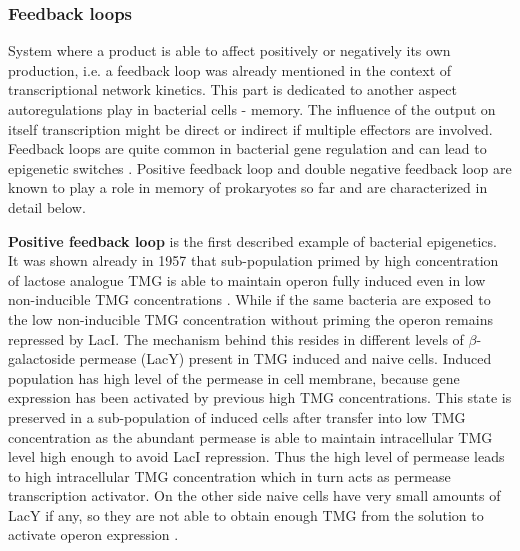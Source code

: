\subsubsection{Feedback loops}
System where a product is able to affect positively or negatively its own production, i.e. a feedback loop was already mentioned in the context of transcriptional network kinetics.
This part is dedicated to another aspect autoregulations play in bacterial cells - memory. 
The influence of the output on itself transcription might be direct or indirect if multiple effectors are involved.
Feedback loops are quite common in bacterial gene regulation and can lead to epigenetic switches \cite{smits2006phenotypic, veening2008bistability}.
Positive feedback loop and double negative feedback loop are known to play a role in memory of prokaryotes so far and are characterized in detail below.

\textbf{Positive feedback loop} is the first described example of bacterial epigenetics.
It was shown already in 1957 that  sub-population primed by high concentration of lactose analogue TMG is able to maintain  operon fully induced even in low non-inducible TMG concentrations \cite{novick1957enzyme}.
While if the same bacteria are exposed to the low non-inducible TMG concentration without priming the  operon remains repressed by LacI.
The mechanism behind this resides in different levels of $\beta$-galactoside permease (LacY) present in TMG induced and naive cells.
Induced population has high level of the permease in cell membrane, because  gene expression has been activated by previous high TMG concentrations.
This state is preserved in a sub-population of induced cells after transfer into low TMG concentration as the abundant permease is able to maintain intracellular TMG level high enough to avoid LacI repression.
Thus the high level of permease leads to high intracellular TMG concentration which in turn acts as permease transcription activator.
On the other side naive cells have very small amounts of LacY if any, so they are not able to obtain enough TMG from the solution to activate  operon expression \cite{smits2006phenotypic, casadesus2013programmed}.


